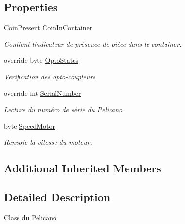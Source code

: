 \subsection*{Properties}
\begin{DoxyCompactItemize}
\item 
\mbox{\hyperlink{class_device_library_1_1_c_pelicano_a87743bbef8551b7349239f48892309c5}{Coin\+Present}} \mbox{\hyperlink{class_device_library_1_1_c_pelicano_ab713ffb697fd137013a1e2ade48406e2}{Coin\+In\+Container}}
\begin{DoxyCompactList}\small\item\em Contient l\textquotesingle{}indicateur de présence de pièce dans le container. \end{DoxyCompactList}\item 
override byte \mbox{\hyperlink{class_device_library_1_1_c_pelicano_a4c21a4fe99ac28fed816dc5cb07fc794}{Opto\+States}}
\begin{DoxyCompactList}\small\item\em Verification des opto-\/coupleurs \end{DoxyCompactList}\item 
override int \mbox{\hyperlink{class_device_library_1_1_c_pelicano_a74a1a52309b0331bb2f6510c698a7183}{Serial\+Number}}
\begin{DoxyCompactList}\small\item\em Lecture du numéro de série du Pelicano \end{DoxyCompactList}\item 
byte \mbox{\hyperlink{class_device_library_1_1_c_pelicano_a7f5c785d7c8107df1bc22912700438bc}{Speed\+Motor}}
\begin{DoxyCompactList}\small\item\em Renvoie la vitesse du moteur. \end{DoxyCompactList}\end{DoxyCompactItemize}
\subsection*{Additional Inherited Members}


\subsection{Detailed Description}
Class du Pelicano 



